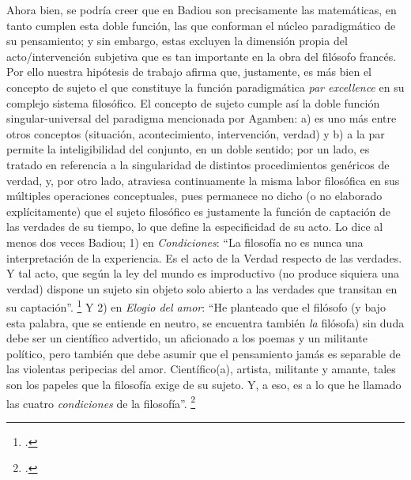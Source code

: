 Ahora bien, se podría creer que en Badiou son precisamente las matemáticas, en tanto cumplen esta doble función, las que conforman el núcleo paradigmático de su pensamiento; y sin embargo, estas excluyen la dimensión propia del acto/intervención subjetiva que es tan importante en la obra del filósofo francés. Por ello nuestra hipótesis de trabajo afirma que, justamente, es más bien el concepto de sujeto el que constituye la función paradigmática \emph{par excellence} en su complejo sistema filosófico. El concepto de sujeto cumple así la doble función singular-universal del paradigma mencionada por Agamben: a) es uno más entre otros conceptos (situación, acontecimiento, intervención, verdad) y b) a la par permite la inteligibilidad del conjunto, en un doble sentido; por un lado, es tratado en referencia a la singularidad de distintos procedimientos genéricos de verdad, y, por otro lado, atraviesa continuamente la misma labor filosófica en sus múltiples operaciones conceptuales, pues permanece no dicho (o no elaborado explícitamente) que el sujeto filosófico es justamente la función de captación de las verdades de su tiempo, lo que define la especificidad de su acto. Lo dice  al menos dos veces Badiou; 1) en \emph{Condiciones}: \enquote{La filosofía no es nunca una interpretación de la experiencia. Es el acto de la Verdad respecto de las verdades. Y tal acto, que según la ley del mundo es improductivo (no produce siquiera una verdad) dispone un sujeto sin objeto solo abierto a las verdades que transitan en su captación}. \footcite[72]{@7072-BADIOU2002} Y 2) en \emph{Elogio del amor}: \enquote{He planteado que el filósofo (y bajo esta palabra, que se entiende en neutro, se encuentra también \emph{la} filósofa) sin duda debe ser un científico advertido, un aficionado a los poemas y un militante político, pero también que debe asumir que el pensamiento jamás es separable de las violentas peripecias del amor. Científico(a), artista, militante y amante, tales son los papeles que la filosofía exige de su sujeto. Y, a eso, es a lo que he llamado las cuatro \emph{condiciones} de la filosofía}. \footcite[4]{@7006-ALAIN2009}

